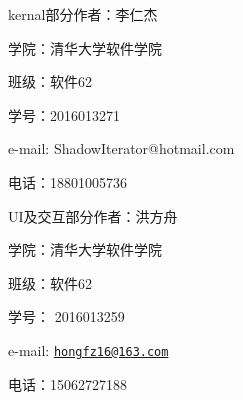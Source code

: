\begin{DoxyItemize}
\item kernal部分作者：李仁杰~\newline

\begin{DoxyItemize}
\item 学院：清华大学软件学院~\newline

\item 班级：软件62~\newline

\item 学号：2016013271~\newline

\item e-\/mail\+: Shadow\+Iterator@hotmail.\+com~\newline

\item 电话：18801005736~\newline

\end{DoxyItemize}
\item U\+I及交互部分作者：洪方舟~\newline

\begin{DoxyItemize}
\item 学院：清华大学软件学院~\newline

\item 班级：软件62~\newline

\item 学号： 2016013259~\newline

\item e-\/mail\+: \href{mailto:hongfz16@163.com}{\tt hongfz16@163.\+com}~\newline

\item 电话：15062727188~\newline

\end{DoxyItemize}
\end{DoxyItemize}